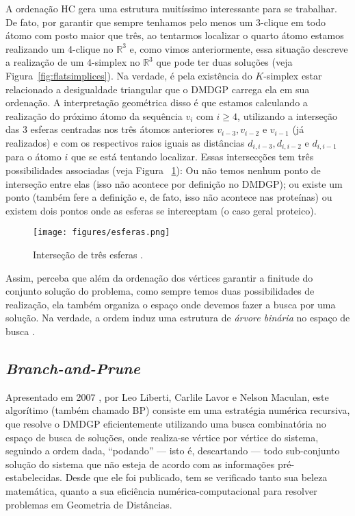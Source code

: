 A ordenação HC gera uma estrutura muitíssimo interessante para se trabalhar. De fato, por garantir que sempre tenhamos pelo menos um 3-clique em todo átomo com posto maior que três, ao tentarmos localizar o quarto átomo estamos realizando um 4-clique no $\mathbb{R}^3$ e, como vimos anteriormente, essa situação descreve a realização de um $4$-simplex no $\mathbb{R}^3$ que pode ter duas soluções (veja Figura~\ref{fig:flatsimplices}). Na verdade, é pela existência do $K$-simplex estar relacionado a desigualdade triangular que o DMDGP carrega ela em sua ordenação. A interpretação geométrica disso é que estamos calculando a realização do próximo átomo da sequência $v_i$ com $i \geq 4$, utilizando a interseção das 3 esferas centradas nos três átomos anteriores $v_{i-3}, v_{i-2}$ e $v_{i-1}$ (já realizados) e com os respectivos raios iguais as distâncias $d_{i,i-3}, d_{i,i-2}$ e $d_{i,i-1}$ para o átomo $i$ que se está tentando localizar. 
Essas intersecções tem três possibilidades associadas (veja Figura ~\ref{fig:esferas}): Ou não temos nenhum ponto de interseção entre elas (isso não acontece por definição no DMDGP); ou existe um ponto (também fere a definição e, de fato, isso não acontece nas proteínas) ou existem dois pontos onde as esferas se interceptam (o caso geral proteico).

\begin{figure}[H]
	\begin{center}
		\texttt{[image: figures/esferas.png]}
	\end{center}
	\caption{Interseção de três esferas \cite{carlileBook31Coloquio}.}
	\label{fig:esferas}
\end{figure}

Assim, perceba que além da ordenação dos vértices garantir a finitude do conjunto solução do problema, como sempre temos duas possibilidades de realização, ela também organiza o espaço onde devemos fazer a busca por uma solução. Na verdade, a ordem induz uma estrutura de \textit{árvore binária} no espaço de busca \cite{fidalgotese}.

\subsection{\textit{Branch-and-Prune} \label{sec:bp}}

Apresentado em 2007 \cite{carlile:BP}, por Leo Liberti, Carlile Lavor e Nelson Maculan, este algorítimo (também chamado BP) consiste em uma estratégia numérica recursiva, que resolve o DMDGP eficientemente utilizando uma busca combinatória no espaço de busca de soluções, onde realiza-se vértice por vértice do sistema, seguindo a ordem dada, ``podando'' --- isto é, descartando --- todo sub-conjunto solução do sistema que não esteja de acordo com as informações pré-estabelecidas. Desde que ele foi publicado, tem se verificado tanto sua beleza matemática, quanto a sua eficiência numérica-computacional para resolver problemas em Geometria de Distâncias.

